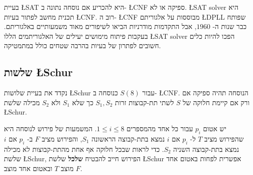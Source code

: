 בעיית
\L{SAT}
היא להכריע אם נוסחה נתונה ב-%
\L{CNF}
ספיקה או לא. 
\L{SAT solver}
היא תכנית מחשב לפתור בעיות
\L{CNF}.
רוב ה-%
\L{CNF}
מבוססות על אלגוריתם
\L{DPLL}
שפותח כבר שנות ה-%
$1960$,
אבל התקדמות מודרניות הביאו לשיפורים מאוד משמעותיים באלגוריתם. בעקבות פיתוח מימושים יעילים של האלגוריתמים הללו 
\L{SAT solver}
הפכו להיות כלים חשובים לפתרון של בעיות בהרבה שטחים כולל במתמטיקה.

\subsection{שלשות \L{Schur}}

נקדד את בעיית שלושות
\L{Schur}
עבור 
$S(8)$
כנוסחה ב-%
\L{CNF}.
הנוסחה תהיה ספיקה אם ורק אם קיימת חלוקה של 
$S$
לשתי תת-קבוצות זרות
$S_1,S_2$
כך שלא 
$S_1$
ולא
$S_2$
מכילה שלשת
\L{Schur}.

יש אטום
$p_i$
עבור כל אחד מהמספרים
$1\leq i \leq 8$.
המשמעות של פירוש לנוסחה היא שהפירוש מציב
$T$
ל-%
$p_i$
אם
$i$
נמצא בתת-קבוצה הראשונה 
$S_1$,
והפירוש מציב 
$F$
ב-%
$p_i$
אם 
$i$
נמצא בתת-קבוצה השניה
$S_2$.
כדי לראות שבכל חלוקה אף אחת מהתת-קבוצות לא מכילה שלשת
\L{Schur},
הפירוש חייב להבטיח 
\textbf{שלכל}
שלשת
\L{Schur}
אפשרית לפחות באטום אחד מוצב
$T$
ובאטום אחד מוצב
$F$. 

